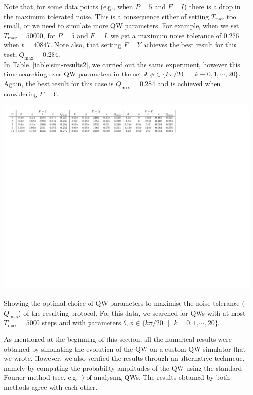 Note that, for some data points (e.g., when $P = 5$ and $F = I$) there is a drop in the maximum tolerated noise.  This is a consequence either of setting $T_{\text{max}}$ too small, or we need to simulate more QW parameters. For example, when we set $T_{\max} = 50000$, for $P = 5$ and $F = I$, we get a maximum noise tolerance of $0.236$ when $t = 40847$.  Note also, that setting $F = Y$ achieves the best result for this test, $Q_{\text{max}}=0.284$.\\

In Table~\ref{table:sim-results2}, we carried out the same experiment, however this time searching over QW parameters in the set $\theta, \phi \in \{k\pi/20 \text{ } | \text{ } k = 0, 1, \cdots, 20\}$. Again, the best result for this case is $Q_{\text{max}}=0.284$ and is achieved when considering $F = Y$. 

\begin{center}
	\begin{table}[h!]
		\includegraphics{Table2.pdf}
		\caption{Showing the optimal choice of QW parameters to maximise the noise tolerance ($Q_{\text{max}}$) of the resulting protocol.  For this data, we searched for QWs with at most $T_{\text{max}} = 5000$ steps and with parameters $\theta,\phi \in \{k\pi/20 \text{ } | \text{ } k = 0, 1, \cdots, 20\}$.}\label{table:sim-results2}
	\end{table}
\end{center}

As mentioned at the beginning of this section, all the numerical results were obtained by simulating the evolution of the QW on a custom QW simulator that we wrote. However, we also verified the results through an alternative technique, namely by computing the probability amplitudes of the QW using the standard Fourier method (see, e.g.~\cite{nay:vis:00,ven:and:12}) of analysing QWs. The results obtained by both methods agree with each other.\\

